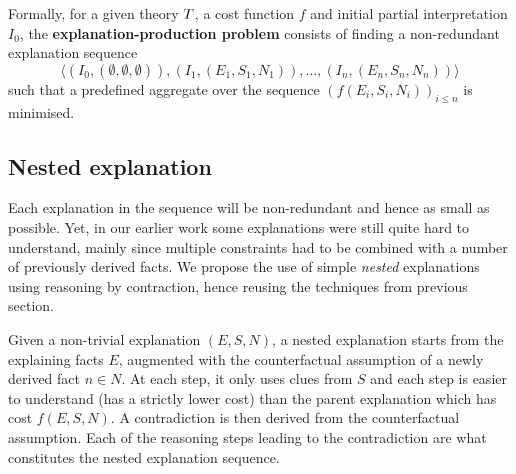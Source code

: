 Formally, for a given theory $T$, a cost function $f$ and initial partial interpretation $I_0$, the \textbf{explanation-production problem} consists of finding a non-redundant explanation sequence
\[\langle(I_0,(\emptyset,\emptyset,\emptyset)), (I_1,(E_1,S_1,N_1)), \dots ,(I_n,(E_n,S_n,N_n))\rangle\]
such that a predefined aggregate over the sequence $\left(f(E_i,S_i,N_i)\right)_{i\leq n}$ is minimised.

\subsection{Nested explanation}
Each explanation in the sequence will be non-redundant and hence as small as possible. 
Yet, in our earlier work some explanations were still quite hard to understand, mainly since multiple constraints had to be combined with a number of previously derived facts. 
We propose the use of simple \textit{nested} explanations using reasoning by contraction, hence reusing the techniques from previous section. 

Given a non-trivial explanation $(E,S,N)$, a nested explanation starts from the explaining facts $E$, augmented with the counterfactual assumption of a newly derived fact $n \in N$. 
At each step, it only uses clues from $S$ and each step is easier to understand (has a strictly lower cost) than the parent explanation which has cost $f(E,S,N)$. 
A contradiction is then derived from the counterfactual assumption.
Each of the reasoning steps leading to the contradiction are what constitutes the nested explanation sequence.

